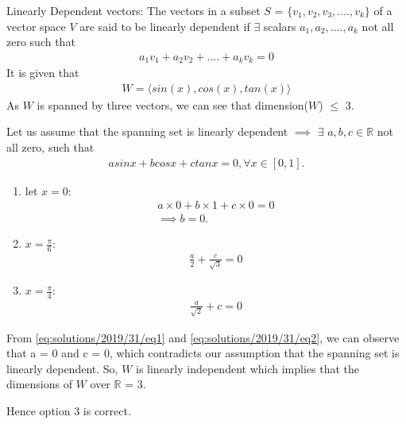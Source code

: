 Linearly Dependent vectors: The vectors in a subset $S$ = $\{v_1, v_2, v_3, ...., v_k\}$ of a vector space $V$ are said to be linearly dependent if $\exists$ scalars $a_1, a_2, ...., a_k$ not all zero such that 
\begin{align}
    a_1v_1 + a_2v_2 + .... + a_kv_k = 0
\end{align}
It is given that 
\begin{align}
    W =\langle sin(x), cos(x), tan(x) \rangle
\end{align}
As $W$ is spanned by three vectors, we can see that dimension($W$) $\leq$ 3.

Let us assume that the spanning set is linearly dependent $ \implies$  $\exists$  $a,b,c \in \mathbb{R}$ not all zero, such that
\begin{align}
    asinx + bcosx + ctanx = 0,  \forall x \in [0, 1]. 
\end{align}
\begin{enumerate}
    \item let $x = 0$: 
    \begin{align}
        a\times0 + b\times1 + c\times0 = 0 \\
        \implies b = 0.
    \end{align}
    \item $x = \frac{\pi}{6}$:
    \begin{align}
        \frac{a}{2} + \frac{c}{\sqrt{3}} = 0 \label{eq:solutions/2019/31/eq1}
    \end{align}
    \item $x = \frac{\pi}{4}$:
    \begin{align}
        \frac{a}{\sqrt{2}} + c = 0 \label{eq:solutions/2019/31/eq2}
    \end{align}
\end{enumerate}
From \eqref{eq:solutions/2019/31/eq1} and \eqref{eq:solutions/2019/31/eq2}, we can observe that a = 0 and c = 0, which contradicts our assumption that the spanning set is linearly dependent. So, $W$ is linearly independent which implies that the dimensions of $W$ over $\mathbb{R}$ = 3. 

Hence option 3 is correct.
